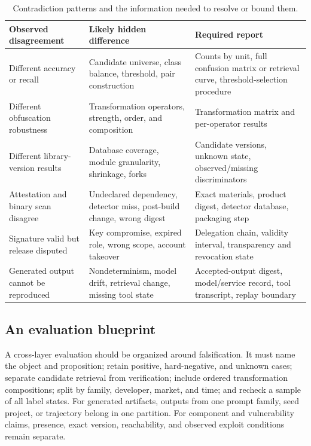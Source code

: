 \begin{table}[t]
\caption{Contradiction patterns and the information needed to resolve or bound them.}
\label{tab:contradictions}
\small
\begin{tabularx}{\textwidth}{L{2.7cm}Y Y}
\toprule
Observed disagreement & Likely hidden difference & Required report \\
\midrule
Different accuracy or recall & Candidate universe, class balance, threshold, pair construction & Counts by unit, full confusion matrix or retrieval curve, threshold-selection procedure \\
Different obfuscation robustness & Transformation operators, strength, order, and composition & Transformation matrix and per-operator results \\
Different library-version results & Database coverage, module granularity, shrinkage, forks & Candidate versions, unknown state, observed/missing discriminators \\
Attestation and binary scan disagree & Undeclared dependency, detector miss, post-build change, wrong digest & Exact materials, product digest, detector database, packaging step \\
Signature valid but release disputed & Key compromise, expired role, wrong scope, account takeover & Delegation chain, validity interval, transparency and revocation state \\
Generated output cannot be reproduced & Nondeterminism, model drift, retrieval change, missing tool state & Accepted-output digest, model/service record, tool transcript, replay boundary \\
\bottomrule
\end{tabularx}
\end{table}

\subsection{An evaluation blueprint}

A cross-layer evaluation should be organized around falsification. It must name the object and proposition; retain positive, hard-negative, and unknown cases; separate candidate retrieval from verification; include ordered transformation compositions; split by family, developer, market, and time; and recheck a sample of all label states. For generated artifacts, outputs from one prompt family, seed project, or trajectory belong in one partition. For component and vulnerability claims, presence, exact version, reachability, and observed exploit conditions remain separate.

